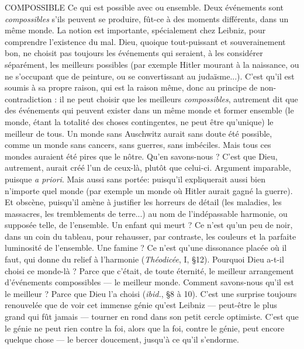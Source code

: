COMPOSSIBLE Ce qui est possible avec ou ensemble. Deux événements
sont {\it compossibles} s'ils peuvent se produire, fût-ce à des
moments différents, dans un même monde. La notion est importante, spécialement
chez Leibniz, pour comprendre l’existence du mal. Dieu, quoique tout-puissant
et souverainement bon, ne choisit pas toujours les événements qui
seraient, à les considérer séparément, les meilleurs possibles (par exemple Hitler
mourant à la naissance, ou ne s’occupant que de peinture, ou se convertissant
au judaïsme...). C’est qu’il est soumis à sa propre raison, qui est la raison
même, donc au principe de non-contradiction : il ne peut choisir que les
meilleurs {\it compossibles}, autrement dit que des événements qui peuvent exister
dans un même monde et former ensemble (le monde, étant la totalité des
choses contingentes, ne peut être qu’unique) le meilleur de tous. Un monde
sans Auschwitz aurait sans doute été possible, comme un monde sans cancers,
sans guerres, sans imbéciles. Mais tous ces mondes auraient été pires que le
nôtre. Qu’en savons-nous ? C’est que Dieu, autrement, aurait créé l’un de
ceux-là, plutôt que celui-ci. Argument imparable, puisque {\it a priori}. Mais aussi
sans portée: puisqu'il expliquerait aussi bien n’importe quel monde (par
exemple un monde où Hitler aurait gagné la guerre). Et obscène, puisqu'il
amène à justifier les horreurs de détail (les maladies, les massacres, les tremblements
de terre...) au nom de l’indépassable harmonie, ou supposée telle, de
l’ensemble. Un enfant qui meurt ? Ce n’est qu’un peu de noir, dans un coin du
tableau, pour rehausser, par contraste, les couleurs et la parfaite luminosité de
l’ensemble. Une famine ? Ce n’est qu’une dissonance placée où il faut, qui
donne du relief à l’harmonie ({\it Théodicée}, I, \S 12). Pourquoi Dieu a-t-il choisi ce
monde-là ? Parce que c'était, de toute éternité, le meilleur arrangement d’événements
compossibles — le meilleur monde. Comment savons-nous qu’il est le
meilleur ? Parce que Dieu l’a choisi ({\it ibid.}, \S 8 à 10). C’est une surprise toujours
renouvelée que de voir cet immense génie qu’est Leibniz — peut-être le plus
grand qui fût jamais — tourner en rond dans son petit cercle optimiste. C’est
que le génie ne peut rien contre la foi, alors que la foi, contre le génie, peut
encore quelque chose — le bercer doucement, jusqu’à ce qu’il s’endorme.

